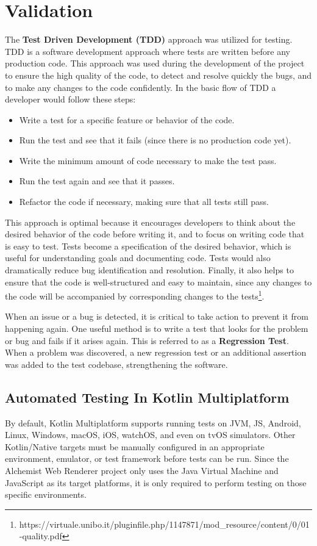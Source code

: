 \chapter{Validation}
\label{chap:validation}
The \textbf{Test Driven Development (TDD)} approach was utilized for testing. TDD is a software development approach where tests are written before any production code. This approach was used during the development of the project to ensure the high quality of the code, to detect and resolve quickly the bugs, and to make any changes to the code confidently. In the basic flow of TDD a developer would follow these steps:
\begin{itemize}
	\item Write a test for a specific feature or behavior of the code.
	\item Run the test and see that it fails (since there is no production code yet).
	\item Write the minimum amount of code necessary to make the test pass.
	\item Run the test again and see that it passes.
	\item Refactor the code if necessary, making sure that all tests still pass.
\end{itemize}
This approach is optimal because it encourages developers to think about the desired behavior of the code before writing it, and to focus on writing code that is easy to test.
Tests become a specification of the desired behavior, which is useful for understanding goals and documenting code.
Tests would also dramatically reduce bug identification and resolution.
Finally, it also helps to ensure that the code is well-structured and easy to maintain, since any changes to the code will be accompanied by corresponding changes to the tests\footnote{https://virtuale.unibo.it/pluginfile.php/1147871/mod\_resource/content/0/01-quality.pdf}.\newline

When an issue or a bug is detected, it is critical to take action to prevent it from happening again. One useful method is to write a test that looks for the problem or bug and fails if it arises again. This is referred to as a \textbf{Regression Test}. When a problem was discovered, a new regression test or an additional assertion was added to the test codebase, strengthening the software.

\section{Automated Testing In Kotlin Multiplatform}
\label{sec:automated-testing-in-kotlin-multiplatform}
By default, Kotlin Multiplatform supports running tests on JVM, JS, Android, Linux, Windows, macOS, iOS, watchOS, and even on tvOS simulators. Other Kotlin/Native targets must be manually configured in an appropriate environment, emulator, or test framework before tests can be run. Since the Alchemist Web Renderer project only uses the Java Virtual Machine and JavaScript as its target platforms, it is only required to perform testing on those specific environments.\newline

